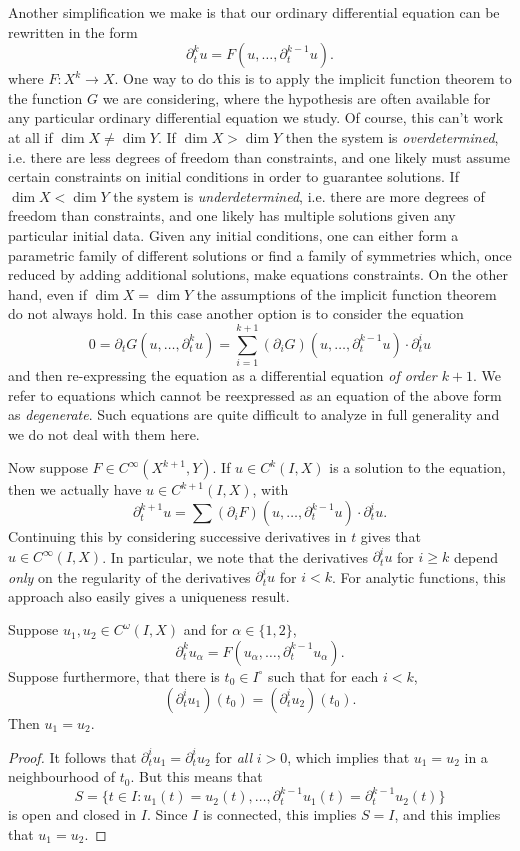 Another simplification we make is that our ordinary differential equation can be rewritten in the form
%
\[ \partial_t^k u = F(u,\dots, \partial_t^{k-1} u). \]
%
where $F: X^k \to X$. One way to do this is to apply the implicit function theorem to the function $G$ we are considering, where the hypothesis are often available for any particular ordinary differential equation we study. Of course, this can't work at all if $\dim X \neq \dim Y$. If $\dim X > \dim Y$ then the system is \emph{overdetermined}, i.e. there are less degrees of freedom than constraints, and one likely must assume certain constraints on initial conditions in order to guarantee solutions. If $\dim X < \dim Y$ the system is \emph{underdetermined}, i.e. there are more degrees of freedom than constraints, and one likely has multiple solutions given any particular initial data. Given any initial conditions, one can either form a parametric family of different solutions or find a family of symmetries which, once reduced by adding additional solutions, make equations constraints. On the other hand, even if $\dim X = \dim Y$ the assumptions of the implicit function theorem do not always hold. In this case another option is to consider the equation
%
\[ 0 = \partial_t G(u,\dots,\partial_t^ku) = \sum_{i = 1}^{k+1} (\partial_i G)(u,\dots,\partial_t^{k-1} u) \cdot \partial_t^i u \]
%
and then re-expressing the equation as a differential equation \emph{of order $k+1$}. We refer to equations which cannot be reexpressed as an equation of the above form as \emph{degenerate}. Such equations are quite difficult to analyze in full generality and we do not deal with them here.

Now suppose $F \in C^\infty(X^{k+1},Y)$. If $u \in C^k(I,X)$ is a solution to the equation, then we actually have $u \in C^{k+1}(I,X)$, with
%
\[ \partial_t^{k+1} u = \sum (\partial_i F)(u,\dots,\partial_t^{k-1}u) \cdot \partial_t^i u. \]
%
Continuing this by considering successive derivatives in $t$ gives that $u \in C^\infty(I,X)$. In particular, we note that the derivatives $\partial_t^i u$ for $i \geq k$ depend \emph{only} on the regularity of the derivatives $\partial_t^i u$ for $i < k$. For analytic functions, this approach also easily gives a uniqueness result.

\begin{lemma}
    Suppose $u_1,u_2 \in C^\omega(I,X)$ and for $\alpha \in \{ 1, 2 \}$,
    \[ \partial_t^k u_\alpha = F(u_\alpha, \dots, \partial_t^{k-1} u_\alpha). \]
    Suppose furthermore, that there is $t_0 \in I^\circ$ such that for each $i < k$,
    \[ (\partial_t^i u_1)(t_0) = (\partial_t^i u_2)(t_0). \]
    Then $u_1 = u_2$.
\end{lemma}
\begin{proof}
    It follows that $\partial_t^i u_1 = \partial_t^i u_2$ for \emph{all} $i > 0$, which implies that $u_1 = u_2$ in a neighbourhood of $t_0$. But this means that
    \[ S = \{ t \in I: u_1(t) = u_2(t), \dots, \partial_t^{k-1} u_1(t) = \partial_t^{k-1} u_2(t) \} \]
    is open and closed in $I$. Since $I$ is connected, this implies $S = I$, and this implies that $u_1 = u_2$.
\end{proof}

